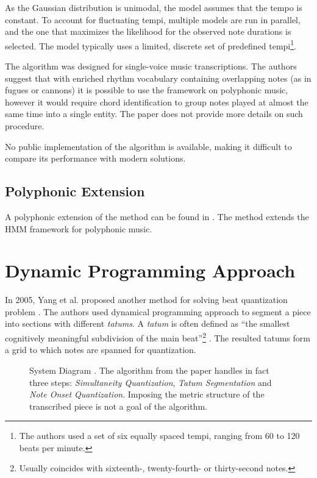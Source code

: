 As the Gaussian distribution is unimodal, the model assumes that the tempo is constant. To account for fluctuating tempi, multiple models are run in parallel, and the one that maximizes the likelihood for the observed note durations is selected. The model typically uses a limited, discrete set of predefined tempi\footnote{The authors used a set of six equally spaced tempi, ranging from 60 to 120 beats per minute.}.

The algorithm was designed for single-voice music transcriptions. The authors suggest that with enriched rhythm vocabulary containing overlapping notes (as in fugues or cannons) it is possible to use the framework on polyphonic music, however it would require chord identification to group notes played at almost the same time into a single entity. The paper does not provide more details on such procedure.

No public implementation of the algorithm is available, making it difficult to compare its performance with modern solutions.

\subsection{Polyphonic Extension}

A polyphonic extension of the method can be found in \cite{Nakamura2017c}. The method extends the HMM framework for polyphonic music.

\section{Dynamic Programming Approach}

In 2005, Yang et al. proposed another method for solving beat quantization problem \cite{Yang2005}. The authors used dynamical programming approach to segment a piece into sections with different \emph{tatums}. A \emph{tatum} is often defined as ``the smallest cognitively meaningful
subdivision of the main beat''\footnote{Usually coincides with sixteenth-, twenty-fourth- or thirty-second notes.} \cite{Iyer1997}. The resulted tatums form a grid to which notes are spanned for quantization.

\begin{figure}[!ht]
\centering

\caption[System Diagram.]{System Diagram \cite{Yang2005}. The algorithm from the paper handles in fact three steps: \emph{Simultaneity Quantization}, \emph{Tatum Segmentation} and \emph{Note Onset Quantization}. Imposing the metric structure of the transcribed piece is not a goal of the algorithm.}
\end{figure}

